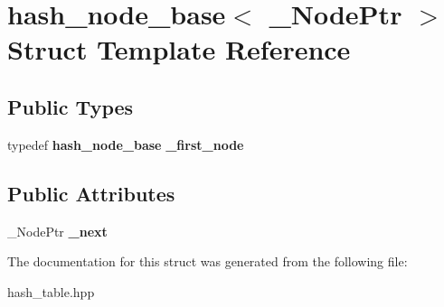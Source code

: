 \section{hash\+\_\+node\+\_\+base$<$ \+\_\+\+Node\+Ptr $>$ Struct Template Reference}
\label{structhash__node__base}
\subsection*{Public Types}
\begin{DoxyCompactItemize}
\item 
typedef {\bf hash\+\_\+node\+\_\+base} {\bfseries \+\_\+first\+\_\+node}\label{structhash__node__base_a41a18af1612ec7f5025b7688033114c2}

\end{DoxyCompactItemize}
\subsection*{Public Attributes}
\begin{DoxyCompactItemize}
\item 
\+\_\+\+Node\+Ptr {\bfseries \+\_\+next}\label{structhash__node__base_afe534be6261b4d84d111dc021c24c4db}

\end{DoxyCompactItemize}


The documentation for this struct was generated from the following file\+:\begin{DoxyCompactItemize}
\item 
hash\+\_\+table.\+hpp\end{DoxyCompactItemize}
